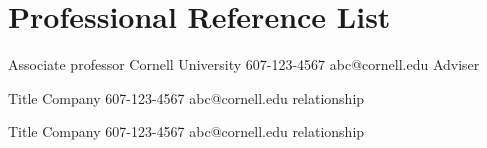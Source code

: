 \section{Professional Reference List}
\vspace*{0.1cm}

{Associate professor}
{Cornell University}
{607-123-4567}
{abc@cornell.edu}
{Adviser}

{Title}
{Company}
{607-123-4567}
{abc@cornell.edu}
{relationship}

{Title}
{Company}
{607-123-4567}
{abc@cornell.edu}
{relationship}